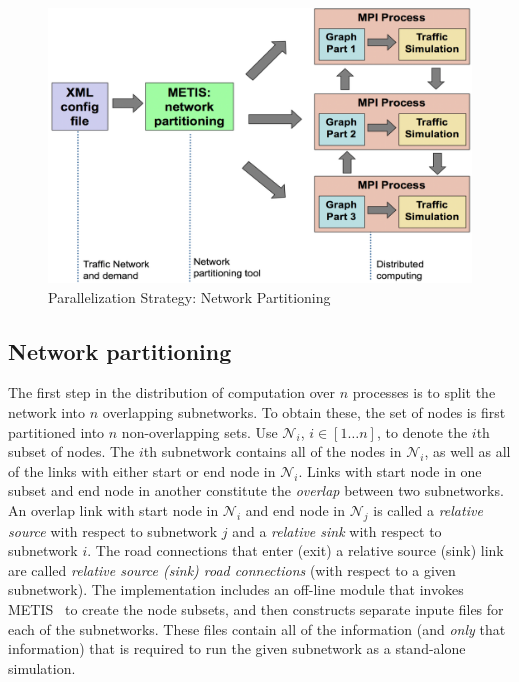 \begin{figure}[h!]
    \centering
    \includegraphics[width=\columnwidth]{figs/Methodology.png}
    \caption{Parallelization Strategy: Network Partitioning}
    \label{fig:Parallel_Strategy}
\end{figure}

\subsection{Network partitioning}

The first step in the distribution of computation over $n$ processes is to split the network into $n$ overlapping subnetworks. To obtain these, the set of nodes is first partitioned into $n$ non-overlapping sets. Use $\mathcal{N}_i$, $i\in[1\hdots n]$, to denote the $i$th subset of nodes. The $i$th subnetwork contains all of the nodes in $\mathcal{N}_i$, as well as all of the links with either start or end node in $\mathcal{N}_i$. 
Links with start node in one subset and end node in another constitute the \textit{overlap} between two subnetworks. An overlap link with start node in $\mathcal{N}_i$ and end node in $\mathcal{N}_j$ is called a \textit{relative source} with respect to subnetwork $j$ and a \textit{relative sink} with respect to subnetwork $i$. The road connections that enter (exit) a relative source (sink) link are called \textit{relative source (sink) road connections} (with respect to a given subnetwork). The implementation includes an off-line module that invokes
METIS~\cite{kaku:98a} to create the node subsets, and then constructs separate inpute files for each of the subnetworks. These files contain all of the information (and \textit{only} that information) that is required to run the given subnetwork as a stand-alone simulation. 

